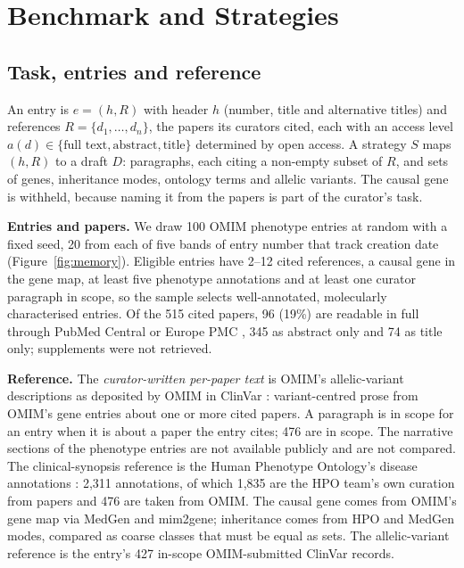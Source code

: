 \documentclass{article} %
\begin{document}
\section{Benchmark and Strategies}
\label{sec:method}
\subsection{Task, entries and reference}
\label{sec:task}
An entry is $e=(h,R)$ with header $h$ (number, title and alternative titles) and references $R=\{d_1,\dots,d_n\}$, the papers its curators cited, each with an access level $a(d)\in\{\text{full text},\text{abstract},\text{title}\}$ determined by open access. A strategy $S$ maps $(h,R)$ to a draft $D$: paragraphs, each citing a non-empty subset of $R$, and sets of genes, inheritance modes, ontology terms and allelic variants. The causal gene is withheld, because naming it from the papers is part of the curator's task.

\textbf{Entries and papers.} We draw 100 OMIM phenotype entries at random with a fixed seed, 20 from each of five bands of entry number that track creation date (Figure~\ref{fig:memory}). Eligible entries have 2--12 cited references, a causal gene in the gene map, at least five phenotype annotations and at least one curator paragraph in scope, so the sample selects well-annotated, molecularly characterised entries. Of the 515 cited papers, 96 (19\%) are readable in full through PubMed Central or Europe PMC \citep{rosonovski2024europe}, 345 as abstract only and 74 as title only; supplements were not retrieved.

\textbf{Reference.} The \emph{curator-written per-paper text} is OMIM's allelic-variant descriptions as deposited by OMIM in ClinVar \citep{landrum2025clinvar}: variant-centred prose from OMIM's gene entries about one or more cited papers. A paragraph is in scope for an entry when it is about a paper the entry cites; 476 are in scope. The narrative sections of the phenotype entries are not available publicly and are not compared. The clinical-synopsis reference is the Human Phenotype Ontology's disease annotations \citep{gargano2024human}: 2,311 annotations, of which 1,835 are the HPO team's own curation from papers and 476 are taken from OMIM. The causal gene comes from OMIM's gene map via MedGen \citep{Louden2020MedgenNcbis} and mim2gene; inheritance comes from HPO and MedGen modes, compared as coarse classes that must be equal as sets. The allelic-variant reference is the entry's 427 in-scope OMIM-submitted ClinVar records.
\end{document}

